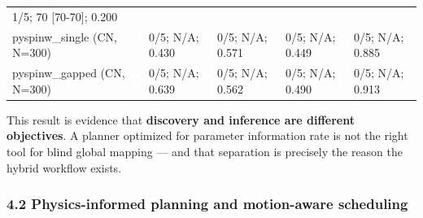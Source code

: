 \documentclass[
]{article}
\begin{document}
\begin{longtable}[]{@{}lllll@{}}
\begin{minipage}[t]{0.17\columnwidth}
1/5; 70 {[}70-70{]}; 0.200\strut
\end{minipage}\tabularnewline
\begin{minipage}[t]{0.18\columnwidth}\raggedright
pyspinw\_single (CN, N=300)\strut
\end{minipage} & \begin{minipage}[t]{0.21\columnwidth}\raggedright
0/5; N/A; 0.430\strut
\end{minipage} & \begin{minipage}[t]{0.15\columnwidth}\raggedright
0/5; N/A; 0.571\strut
\end{minipage} & \begin{minipage}[t]{0.15\columnwidth}\raggedright
0/5; N/A; 0.449\strut
\end{minipage} & \begin{minipage}[t]{0.17\columnwidth}\raggedright
0/5; N/A; 0.885\strut
\end{minipage}\tabularnewline
\begin{minipage}[t]{0.18\columnwidth}\raggedright
pyspinw\_gapped (CN, N=300)\strut
\end{minipage} & \begin{minipage}[t]{0.21\columnwidth}\raggedright
0/5; N/A; 0.639\strut
\end{minipage} & \begin{minipage}[t]{0.15\columnwidth}\raggedright
0/5; N/A; 0.562\strut
\end{minipage} & \begin{minipage}[t]{0.15\columnwidth}\raggedright
0/5; N/A; 0.490\strut
\end{minipage} & \begin{minipage}[t]{0.17\columnwidth}\raggedright
0/5; N/A; 0.913\strut
\end{minipage}\tabularnewline
\bottomrule
\end{longtable}

This result is evidence that \textbf{discovery and inference are
different objectives}. A planner optimized for parameter information
rate is not the right tool for blind global mapping --- and that
separation is precisely the reason the hybrid workflow exists.

\hypertarget{physics-informed-planning-and-motion-aware-scheduling}{%
\subsubsection{4.2 Physics-informed planning and motion-aware
scheduling}\label{physics-informed-planning-and-motion-aware-scheduling}}
\end{document}
